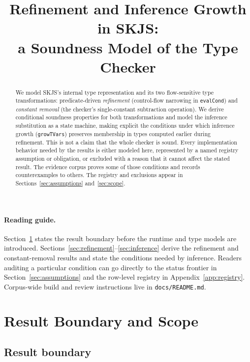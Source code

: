 \documentclass[11pt]{article}
\title{Refinement and Inference Growth in SKJS:\\ a Soundness Model of the Type Checker}
\author{}
\date{\skjspin}
\begin{document}
\maketitle

\begin{abstract}
We model SKJS's internal type representation and its two flow-sensitive type
transformations: predicate-driven \emph{refinement} (control-flow narrowing in
\texttt{evalCond}) and \emph{constant removal} (the checker's single-constant
subtraction operation). We derive conditional
soundness properties for both transformations and model the inference
substitution as a state machine, making explicit the conditions under which
inference growth
(\texttt{growTVars}) preserves membership in types computed earlier during
refinement. This is not a claim
that the whole checker is sound. Every implementation behavior needed by the
results is either modeled here, represented by a named registry assumption or
obligation, or excluded with a reason that it cannot affect the stated result.
The evidence corpus proves some of those conditions and records counterexamples
to others. The registry and exclusions appear in
Sections~\ref{sec:assumptions} and~\ref{sec:scope}.
\end{abstract}

\tableofcontents

\paragraph{Reading guide.}
Section~\ref{sec:scope} states the result boundary before the runtime and type
models are introduced. Sections~\ref{sec:refinement}--\ref{sec:inference}
derive the refinement and constant-removal results and state the conditions
needed by inference. Readers auditing a particular condition can go directly
to the status frontier in Section~\ref{sec:assumptions} and the row-level
registry in Appendix~\ref{app:registry}. Corpus-wide build and review
instructions live in \texttt{docs/README.md}.

\section{Result Boundary and Scope}
\label{sec:scope}

\subsection{Result boundary}
\end{document}
